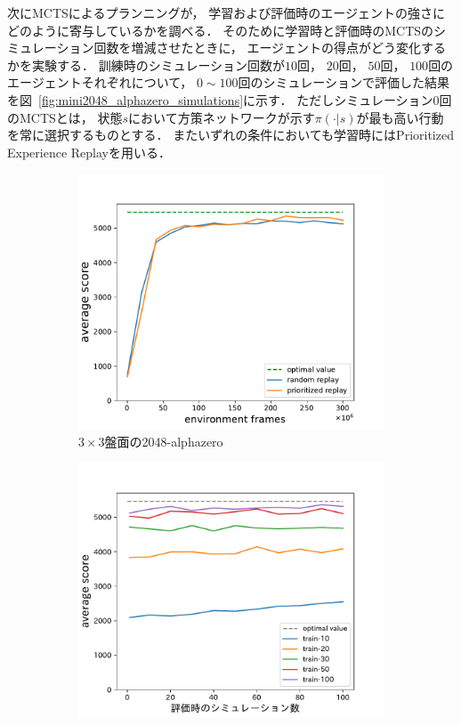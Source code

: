 次にMCTSによるプランニングが， 学習および評価時のエージェントの強さにどのように寄与しているかを調べる．
そのために学習時と評価時のMCTSのシミュレーション回数を増減させたときに， エージェントの得点がどう変化するかを実験する．
訓練時のシミュレーション回数が$10$回， $20$回， $50$回， $100$回のエージェントそれぞれについて， $0 \sim 100$回のシミュレーションで評価した結果を図~\ref{fig:mini2048_alphazero_simulations}に示す．
ただしシミュレーション$0$回のMCTSとは， 状態$s$において方策ネットワークが示す$\pi(\cdot|s)$が最も高い行動を常に選択するものとする．
またいずれの条件においても学習時にはPrioritized Experience Replayを用いる．

\begin{figure}
    \begin{subfigure}[T]{0.5\columnwidth}
        \centering
        \includegraphics[width=\columnwidth]{figures/alphazero_3x3.pdf}
        \caption{$3\times3$盤面の2048-alphazero}
        \label{fig:mini2048_alphazero}
    \end{subfigure}
    \begin{subfigure}[T]{0.5\columnwidth}
        \centering
        \includegraphics[width=\columnwidth]{figures/3x3_2048_alphazero_simulations.pdf}

\end{subfigure}
\end{figure}
